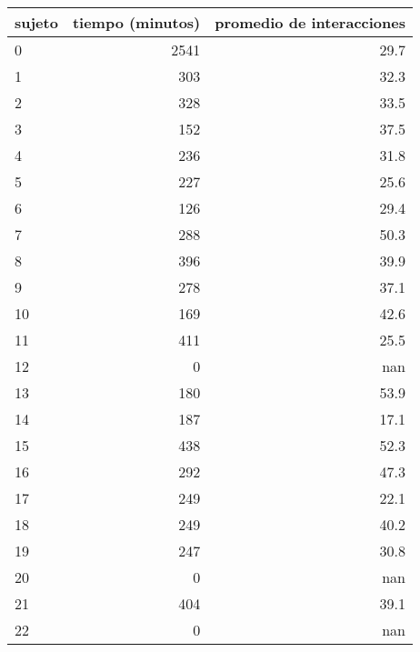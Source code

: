 \documentclass[spanish]{article}
\begin{document}
\begin{table}[h!]
\begin{center}
\begin{tabular}{|l|r|r|}
\hline
sujeto & tiempo (minutos) & promedio de interacciones\\ \hline
     0 &             2541 &                      29.7\\ \hline
     1 &              303 &                      32.3\\ \hline
     2 &              328 &                      33.5\\ \hline
     3 &              152 &                      37.5\\ \hline
     4 &              236 &                      31.8\\ \hline
     5 &              227 &                      25.6\\ \hline
     6 &              126 &                      29.4\\ \hline
     7 &              288 &                      50.3\\ \hline
     8 &              396 &                      39.9\\ \hline
     9 &              278 &                      37.1\\ \hline
    10 &              169 &                      42.6\\ \hline
    11 &              411 &                      25.5\\ \hline
    12 &                0 &                       nan\\ \hline
    13 &              180 &                      53.9\\ \hline
    14 &              187 &                      17.1\\ \hline
    15 &              438 &                      52.3\\ \hline
    16 &              292 &                      47.3\\ \hline
    17 &              249 &                      22.1\\ \hline
    18 &              249 &                      40.2\\ \hline
    19 &              247 &                      30.8\\ \hline
    20 &                0 &                       nan\\ \hline
    21 &              404 &                      39.1\\ \hline
    22 &                0 &                       nan\\ \hline

\end{tabular}
\end{center}
\end{table}
\end{document}
